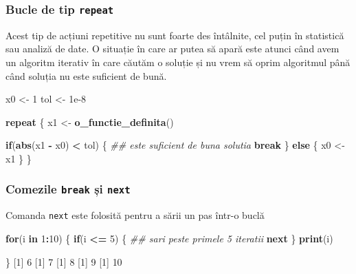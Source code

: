 \documentclass[]{article}
\newenvironment{Shaded}{\begin{snugshade}}{\end{snugshade}}
\newcommand{\CommentTok}[1]{\textcolor[rgb]{0.56,0.35,0.01}{\textit{#1}}}
\newcommand{\ControlFlowTok}[1]{\textcolor[rgb]{0.13,0.29,0.53}{\textbf{#1}}}
\newcommand{\DecValTok}[1]{\textcolor[rgb]{0.00,0.00,0.81}{#1}}
\newcommand{\FloatTok}[1]{\textcolor[rgb]{0.00,0.00,0.81}{#1}}
\newcommand{\KeywordTok}[1]{\textcolor[rgb]{0.13,0.29,0.53}{\textbf{#1}}}
\newcommand{\NormalTok}[1]{#1}
\newcommand{\OperatorTok}[1]{\textcolor[rgb]{0.81,0.36,0.00}{\textbf{#1}}}
\newcommand{\StringTok}[1]{\textcolor[rgb]{0.31,0.60,0.02}{#1}}
\newcounter{exo}[section]
\begin{document}
\hypertarget{bucle-de-tip-repeat}{%
\subsubsection{\texorpdfstring{Bucle de tip
\texttt{repeat}}{Bucle de tip repeat}}\label{bucle-de-tip-repeat}}

Acest tip de acțiuni repetitive nu sunt foarte des întâlnite, cel puțin
în statistică sau analiză de date. O situație în care ar putea să apară
este atunci când avem un algoritm iterativ în care căutăm o soluție și
nu vrem să oprim algoritmul până când soluția nu este suficient de bună.

\begin{Shaded}
\begin{Highlighting}[]
\NormalTok{x0 <-}\StringTok{ }\DecValTok{1}
\NormalTok{tol <-}\StringTok{ }\FloatTok{1e-8}

\ControlFlowTok{repeat}\NormalTok{ \{}
\NormalTok{        x1 <-}\StringTok{ }\KeywordTok{o_functie_definita}\NormalTok{()}
        
        \ControlFlowTok{if}\NormalTok{(}\KeywordTok{abs}\NormalTok{(x1 }\OperatorTok{-}\StringTok{ }\NormalTok{x0) }\OperatorTok{<}\StringTok{ }\NormalTok{tol) \{  }\CommentTok{## este suficient de buna solutia }
                \ControlFlowTok{break}
\NormalTok{        \} }\ControlFlowTok{else}\NormalTok{ \{}
\NormalTok{                x0 <-}\StringTok{ }\NormalTok{x1}
\NormalTok{        \} }
\NormalTok{\}}
\end{Highlighting}
\end{Shaded}

\hypertarget{comezile-break-ux219i-next}{%
\subsubsection{\texorpdfstring{Comezile \texttt{break} și
\texttt{next}}{Comezile break și next}}\label{comezile-break-ux219i-next}}

Comanda \texttt{next} este folosită pentru a sării un pas într-o buclă

\begin{Shaded}
\begin{Highlighting}[]
\ControlFlowTok{for}\NormalTok{(i }\ControlFlowTok{in} \DecValTok{1}\OperatorTok{:}\DecValTok{10}\NormalTok{) \{}
        \ControlFlowTok{if}\NormalTok{(i }\OperatorTok{<=}\StringTok{ }\DecValTok{5}\NormalTok{) \{}
                \CommentTok{## sari peste primele 5 iteratii}
                \ControlFlowTok{next}                 
\NormalTok{        \}}
  \KeywordTok{print}\NormalTok{(i)}
        
\NormalTok{\}}
\NormalTok{[}\DecValTok{1}\NormalTok{] }\DecValTok{6}
\NormalTok{[}\DecValTok{1}\NormalTok{] }\DecValTok{7}
\NormalTok{[}\DecValTok{1}\NormalTok{] }\DecValTok{8}
\NormalTok{[}\DecValTok{1}\NormalTok{] }\DecValTok{9}
\NormalTok{[}\DecValTok{1}\NormalTok{] }\DecValTok{10}
\end{Highlighting}
\end{Shaded}
\end{document}
